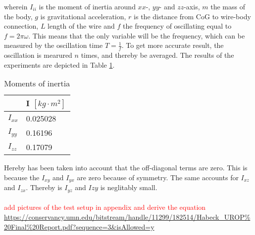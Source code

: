 wherein $I_{ii}$ is the moment of inertia around $xx$-, $yy$- and $zz$-axis, $m$ the mass of the body, $g$ is gravitational acceleration, $r$ is the distance from CoG to wire-body connection, $L$ length of the wire and $f$ the frequency of oscillating equal to $f=2\pi \omega$. This means that the only variable will be the frequency, which can be measured by the oscillation time $T=\frac{1}{f}$. To get more accurate result, the oscillation is mearured $n$ times, and thereby be averaged. The results of the experiments are depicted in Table \ref{tab:inertia}.\\

\begin{table}[H]
\centering
\caption{Moments of inertia}
\label{tab:inertia}
\begin{tabular}{|l|l|} \hline
         & I $\left[kg \cdot m^2\right]$ \\ \hline
$I_{xx}$ & 0.025028 \\ \hline
$I_{yy}$ & 0.16196 \\ \hline
$I_{zz}$ & 0.17079 \\ \hline
\end{tabular}
\end{table}

Hereby has been taken into account that the off-diagonal terms are zero. This is because the $I_{xy}$ and $I_{yx}$ are zero because of symmetry. The same accounts for $I_{xz}$ and $I_{zx}$. Thereby is $I_{yz}$ and $I{zy}$ is neglitably small.\\\\

\textcolor{red}{add pictures of the test setup in appendix and derive the equation}\\

\url{https://conservancy.umn.edu/bitstream/handle/11299/182514/Habeck_UROP%20Final%20Report.pdf?sequence=3&isAllowed=y}\\
















